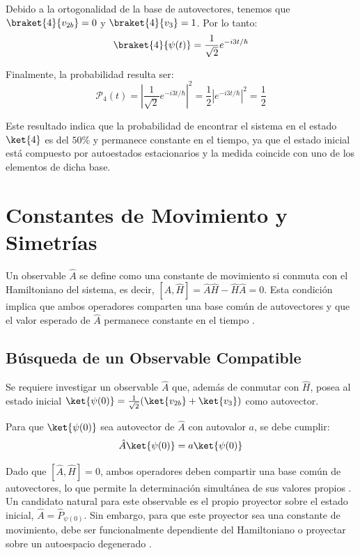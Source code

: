 \documentclass[11pt,a4paper,spanish]{book}
\begin{document}
Debido a la ortogonalidad de la base de autovectores, tenemos que $\braket{4}{v_{2b}} = 0$ y $\braket{4}{v_3} = 1$. Por lo tanto:
\begin{equation}
    \braket{4}{\psi(t)} = \frac{1}{\sqrt{2}} e^{-i 3t/\hbar}
\end{equation}

Finalmente, la probabilidad resulta ser:
\begin{equation}
    \mathcal{P}_4(t) = \left| \frac{1}{\sqrt{2}} e^{-i 3t/\hbar} \right|^2 = \frac{1}{2} |e^{-i 3t/\hbar}|^2 = \frac{1}{2}
\end{equation}

Este resultado indica que la probabilidad de encontrar el sistema en el estado $\ket{4}$ es del $50\%$ y permanece constante en el tiempo, ya que el estado inicial está compuesto por autoestados estacionarios y la medida coincide con uno de los elementos de dicha base.
\section{Constantes de Movimiento y Simetrías}

Un observable $\hat{A}$ se define como una constante de movimiento si conmuta con el Hamiltoniano del sistema, es decir, $[\hat{A}, \hat{H}] = \hat{A}\hat{H} - \hat{H}\hat{A} = 0$. Esta condición implica que ambos operadores comparten una base común de autovectores y que el valor esperado de $\hat{A}$ permanece constante en el tiempo \citep{noether1918}.

\subsection{Búsqueda de un Observable Compatible}

Se requiere investigar un observable $\hat{A}$ que, además de conmutar con $\hat{H}$, posea al estado inicial $\ket{\psi(0)} = \frac{1}{\sqrt{2}}(\ket{v_{2b}} + \ket{v_3})$ como autovector. 

Para que $\ket{\psi(0)}$ sea autovector de $\hat{A}$ con autovalor $a$, se debe cumplir:
\begin{equation}
    \hat{A} \ket{\psi(0)} = a \ket{\psi(0)}
\end{equation}

Dado que $[\hat{A}, \hat{H}] = 0$, ambos operadores deben compartir una base común de autovectores, lo que permite la determinación simultánea de sus valores propios \citep{heisenberg1927}. Un candidato natural para este observable es el propio proyector sobre el estado inicial, $\hat{A} = \hat{P}_{\psi(0)}$. Sin embargo, para que este proyector sea una constante de movimiento, debe ser funcionalmente dependiente del Hamiltoniano o proyectar sobre un autoespacio degenerado \citep{vonneumann1932}.
\end{document}
